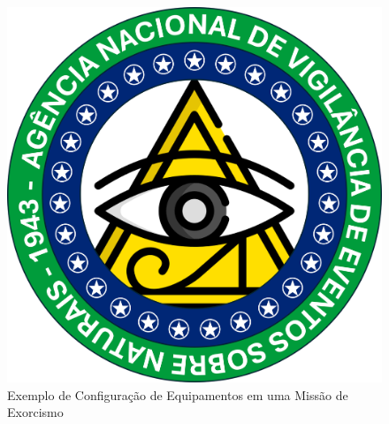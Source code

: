 \documentclass{book}
\begin{document}
\begin{figure}[hbt]
    \centering
    \includegraphics[width=0.5\linewidth]{imagens/ANVESN_LOGO.png}
    \caption{Exemplo de Configuração de Equipamentos em uma Missão de Exorcismo}
    \label{fig:example-setup}
\end{figure}
\end{document}

